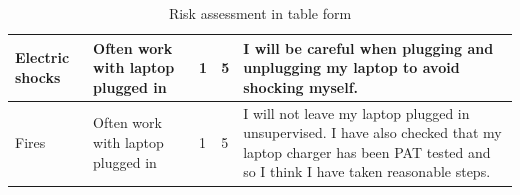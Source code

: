 \documentclass[12pt,onecolumn,letterpaper]{article}
\begin{document}
\begin{table}[!htbp]
{{\begin{tabular}{|p{1.2cm}|p{1.5cm}|p{1.3cm}|p{1.2cm}|p{7cm}|}
Electric shocks                & Often work with laptop plugged in & 1                        & 5                           & I will be careful when plugging and unplugging my laptop to avoid shocking myself.                                                                                                                                                                                             \\ \hline
Fires                          & Often work with laptop plugged in & 1                        & 5                           & I will not leave my laptop plugged in unsupervised. I have also checked that my laptop charger has been PAT tested and so I think I have taken reasonable steps.                                                                                                               \\ \hline
\end{tabular}
}}
\caption{Risk assessment in table form}
\label{tab:RiskAssessment}
\end{table}


{\small


}
\end{document}
